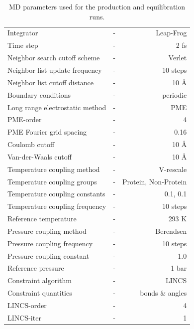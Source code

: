 \documentclass[english, a4paper, 12pt, titlepage, draft]{article}
\begin{document}
\begin{table}
\centering
\begin{tabular}{l c r}
    \hline \hline
    Integrator                      & - & Leap-Frog \\
    Time step                        & - & 2 fs \\
    Neighbor search cutoff scheme   & - & Verlet \\
    Neighbor list update frequency  & - & 10 steps \\
    Neighbor list cutoff distance   & - & 10 \r{A} \\
    Boundary conditions             & - & periodic \\
    Long range electrostatic method & - & PME \\
    PME-order                       & - & 4 \\
    PME Fourier grid spacing        & - & 0.16 \\
    Coulomb cutoff                  & - & 10 \r{A} \\
    Van-der-Waals cutoff            & - & 10 \r{A} \\
    Temperature coupling method     & - & V-rescale \\
    Temperature coupling groups     & - & Protein, Non-Protein \\
    Temperature coupling constants  & - & 0.1, 0.1 \\
    Temperature coupling frequency  & - & 10 steps \\
    Reference temperature           & - & 293 K \\
    Pressure coupling method        & - & Berendsen \\
    Pressure coupling frequency     & - & 10 steps \\
    Pressure coupling constant      & - & 1.0 \\
    Reference pressure              & - & 1 bar \\
    Constraint algorithm            & - & LINCS \\
    Constraint quantities           & - & bonds \& angles \\
    LINCS-order                     & - & 4 \\
    LINCS-iter                      & - & 1 \\
    \hline \hline
\end{tabular}
\caption{MD parameters used for the production and equilibration runs.}
\label{tab:MDparams}
\end{table}
\end{document}
